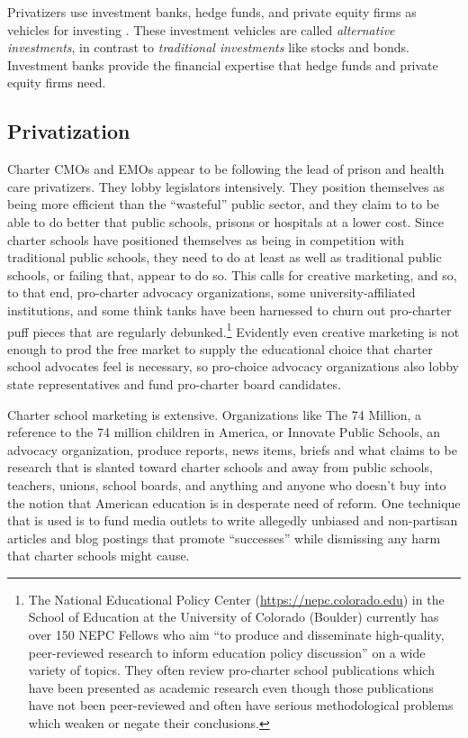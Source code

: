 Privatizers use investment banks, hedge funds, and private equity firms as vehicles for investing \parencite{Stowell2018}. These investment vehicles are called \textit{alternative investments}, in contrast to \textit{traditional investments} like stocks and bonds. Investment banks provide the financial expertise that hedge funds and private equity firms need. 

\subsection{Privatization}\label{sec:privatization}\indent

Charter CMOs and EMOs appear to be following the lead of prison and health care privatizers. They lobby legislators intensively. They position themselves as being more efficient than the ``wasteful'' public sector, and they claim to to be able to do better that public schools, prisons or hospitals at a lower cost. Since charter schools have positioned themselves as being in competition with traditional public schools, they need to do at least as well as traditional public schools, or failing that, appear to do so. This calls for creative marketing, and so, to that end, pro-charter advocacy organizations, some university-affiliated institutions, and some think tanks have been harnessed to churn out pro-charter puff pieces that are regularly debunked.\footnote{The National Educational Policy Center (\url{https://nepc.colorado.edu}) in the School of Education at the University of Colorado (Boulder) currently has over 150 NEPC Fellows who aim ``to produce and disseminate high-quality, peer-reviewed research to inform education policy discussion'' on a wide variety of topics. They often review pro-charter school publications which have been presented as academic research even though those publications have not been peer-reviewed and often have serious methodological problems which weaken or negate their conclusions.} Evidently even creative marketing is not enough to prod the free market to supply the educational choice that charter school advocates feel is necessary, so pro-choice advocacy organizations also lobby state representatives and fund pro-charter board candidates.

Charter school marketing is extensive. Organizations like The 74 Million, a reference to the 74 million children in America, or Innovate Public Schools, an advocacy organization, produce reports, news items, briefs and what claims to be research that is slanted toward charter schools and away from public schools, teachers, unions, school boards, and anything and anyone who doesn't buy into the notion that American education is in desperate need of reform. One technique that is used is to fund media outlets to write allegedly unbiased and non-partisan articles and blog postings that promote ``successes'' while dismissing any harm that charter schools might cause.

